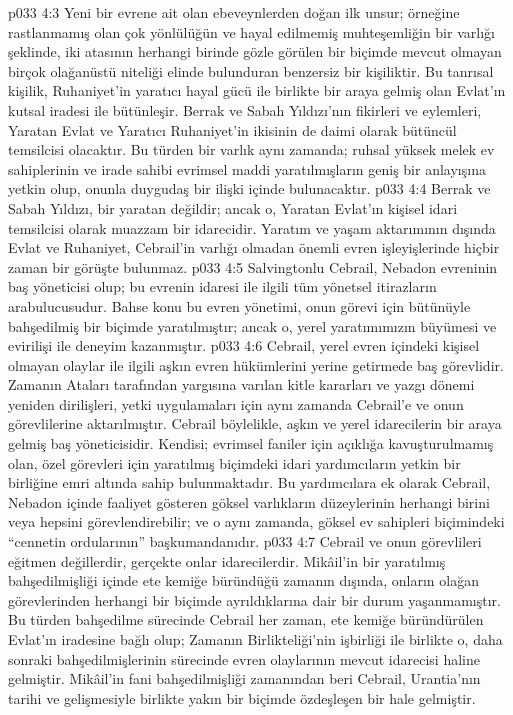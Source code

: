 \vs p033 4:3 Yeni bir evrene ait olan ebeveynlerden doğan ilk unsur; örneğine rastlanmamış olan çok yönlülüğün ve hayal edilmemiş muhteşemliğin bir varlığı şeklinde, iki atasının herhangi birinde gözle görülen bir biçimde mevcut olmayan birçok olağanüstü niteliği elinde bulunduran benzersiz bir kişiliktir. Bu tanrısal kişilik, Ruhaniyet’in yaratıcı hayal gücü ile birlikte bir araya gelmiş olan Evlat’ın kutsal iradesi ile bütünleşir. Berrak ve Sabah Yıldızı’nın fikirleri ve eylemleri, Yaratan Evlat ve Yaratıcı Ruhaniyet’in ikisinin de daimi olarak bütüncül temsilcisi olacaktır. Bu türden bir varlık aynı zamanda; ruhsal yüksek melek ev sahiplerinin ve irade sahibi evrimsel maddi yaratılmışların geniş bir anlayışına yetkin olup, onunla duygudaş bir ilişki içinde bulunacaktır.
\vs p033 4:4 Berrak ve Sabah Yıldızı, bir yaratan değildir; ancak o, Yaratan Evlat’ın kişisel idari temsilcisi olarak muazzam bir idarecidir. Yaratım ve yaşam aktarımının dışında Evlat ve Ruhaniyet, Cebrail’in varlığı olmadan önemli evren işleyişlerinde hiçbir zaman bir görüşte bulunmaz.
\vs p033 4:5 Salvingtonlu Cebrail, Nebadon evreninin baş yöneticisi olup; bu evrenin idaresi ile ilgili tüm yönetsel itirazların arabulucusudur. Bahse konu bu evren yönetimi, onun görevi için bütünüyle bahşedilmiş bir biçimde yaratılmıştır; ancak o, yerel yaratımımızın büyümesi ve evirilişi ile deneyim kazanmıştır.
\vs p033 4:6 Cebrail, yerel evren içindeki kişisel olmayan olaylar ile ilgili aşkın evren hükümlerini yerine getirmede baş görevlidir. Zamanın Ataları tarafından yargısına varılan kitle kararları ve yazgı dönemi yeniden dirilişleri, yetki uygulamaları için aynı zamanda Cebrail’e ve onun görevlilerine aktarılmıştır. Cebrail böylelikle, aşkın ve yerel idarecilerin bir araya gelmiş baş yöneticisidir. Kendisi; evrimsel faniler için açıklığa kavuşturulmamış olan, özel görevleri için yaratılmış biçimdeki idari yardımcıların yetkin bir birliğine emri altında sahip bulunmaktadır. Bu yardımcılara ek olarak Cebrail, Nebadon içinde faaliyet gösteren göksel varlıkların düzeylerinin herhangi birini veya hepsini görevlendirebilir; ve o aynı zamanda, göksel ev sahipleri biçimindeki “cennetin ordularının” başkumandanıdır.
\vs p033 4:7 Cebrail ve onun görevlileri eğitmen değillerdir, gerçekte onlar idarecilerdir. Mikâil’in bir yaratılmış bahşedilmişliği içinde ete kemiğe büründüğü zamanın dışında, onların olağan görevlerinden herhangi bir biçimde ayrıldıklarına dair bir durum yaşanmamıştır. Bu türden bahşedilme sürecinde Cebrail her zaman, ete kemiğe büründürülen Evlat’ın iradesine bağlı olup; Zamanın Birlikteliği’nin işbirliği ile birlikte o, daha sonraki bahşedilmişlerinin sürecinde evren olaylarının mevcut idarecisi haline gelmiştir. Mikâil’in fani bahşedilmişliği zamanından beri Cebrail, Urantia’nın tarihi ve gelişmesiyle birlikte yakın bir biçimde özdeşleşen bir hale gelmiştir.
